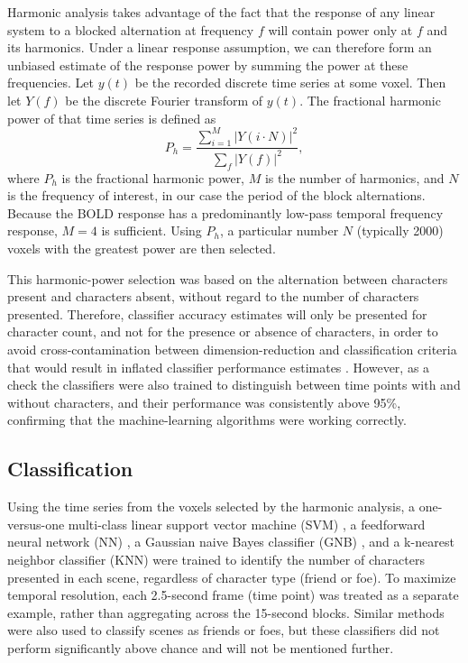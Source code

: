 \documentclass[5p,authoryear]{elsarticle}
\begin{document}
Harmonic analysis takes advantage of the fact that the response of any linear system to a blocked alternation at frequency $f$ will contain power only at $f$ and its harmonics. 
Under a linear response assumption, we can therefore form an unbiased estimate of the response power by summing the power at these frequencies. 
Let $y(t)$ be the recorded discrete time series at some voxel.
Then let $Y(f)$ be the discrete Fourier transform of $y(t)$.
The fractional harmonic power of that time series is defined as
\begin{equation}
P_h = \frac{\sum_{i = 1}^{M}{\left|Y(i \cdot N)\right|^{2}}}{\sum_{f}{\left|Y(f)\right|^{2}}},
\end{equation}
where $P_h$ is the fractional harmonic power, $M$ is the number of harmonics, and $N$ is the frequency of interest, in our case the period of the block alternations. 
Because the BOLD response has a predominantly low-pass temporal frequency response, $M = 4$ is sufficient. 
Using $P_h$, a particular number $N$ (typically 2000) voxels with the greatest power are then selected. 

This harmonic-power selection was based on the alternation between characters present and characters absent, without regard to the number of characters presented. 
Therefore, classifier accuracy estimates will only be presented for character count, and not for the presence or absence of characters, in order to avoid cross-contamination between dimension-reduction and  classification criteria that would result in inflated classifier performance estimates \citep{Pereira2009}.
However, as a check the classifiers were also trained to distinguish between time points with and without characters, and their performance was consistently above 95\%, confirming that the machine-learning algorithms were working correctly.

\subsection{Classification}
Using the time series from the voxels selected by the harmonic analysis, a one-versus-one multi-class linear support vector machine (SVM) \citep{Cortes1995,Weston1999}, a feedforward neural network (NN) \citep{Hornik1989,Hagan1994}, a Gaussian naive Bayes classifier (GNB) \citep{Duda1973}, and a k-nearest neighbor classifier (KNN) \citep{Cover1967} were trained to identify the number of characters presented in each scene, regardless of character type (friend or foe).
To maximize temporal resolution, each 2.5-second frame (time point) was treated as a separate example, rather than aggregating across the 15-second blocks.
Similar methods were also used to classify scenes as friends or foes, but these classifiers did not perform significantly above chance and will not be mentioned further.
\end{document}
